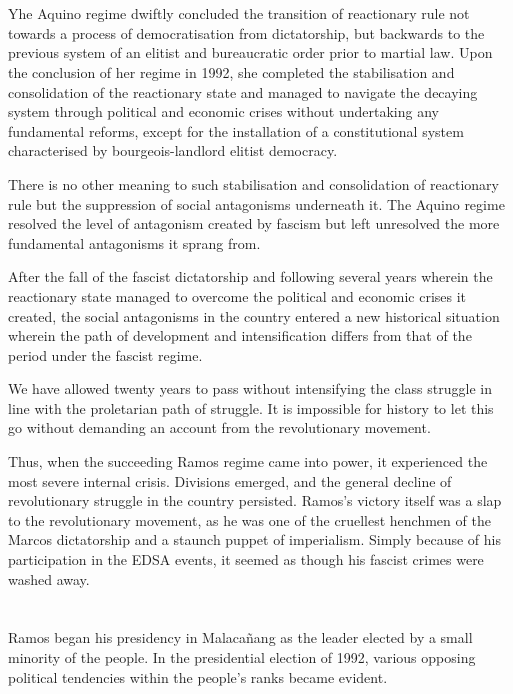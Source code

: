 \section{}
Yhe Aquino regime dwiftly concluded the transition of reactionary rule 
not towards a process of democratisation from dictatorship, 
but backwards to the previous system of an elitist and bureaucratic order 
prior to martial law.
Upon the conclusion of her regime in 1992, 
she completed the stabilisation and consolidation of the reactionary state 
and managed to navigate the decaying system 
through political and economic crises without undertaking 
any fundamental reforms, 
except for the installation of a constitutional system 
characterised by bourgeois-landlord elitist democracy.

There is no other meaning to such stabilisation and consolidation 
of reactionary rule 
but the suppression of social antagonisms underneath it. 
The Aquino regime resolved the level of antagonism created by fascism 
but left unresolved the more fundamental antagonisms it sprang from.

After the fall of the fascist dictatorship and following several years 
wherein the reactionary state managed to overcome 
the political and economic crises it created, 
the social antagonisms in the country entered a new historical situation 
wherein the path of development and intensification differs 
from that of the period under the fascist regime.

We have allowed twenty years to pass without 
intensifying the class struggle in line with the proletarian path of struggle. 
It is impossible for history to let this go without demanding an account 
from the revolutionary movement.

Thus, when the succeeding Ramos regime came into power, 
it experienced the most severe internal crisis. 
Divisions emerged, 
and the general decline of revolutionary struggle in the country persisted. 
Ramos's victory itself was a slap to the revolutionary movement, 
as he was one of the cruellest henchmen of the Marcos dictatorship 
and a staunch puppet of imperialism. 
Simply because of his participation in the EDSA events, 
it seemed as though his fascist crimes were washed away.

\section{}
Ramos began his presidency in Malacañang 
as the leader elected by a small minority of the people. 
In the presidential election of 1992, 
various opposing political tendencies within the people's ranks became evident.

